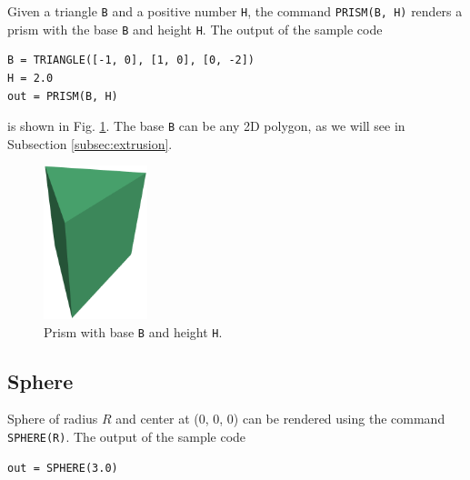 Given a triangle {\tt B} and a positive number {\tt H}, the command 
{\tt PRISM(B, H)} renders a prism with the base {\tt B} and height {\tt H}. 
The output of the sample code\\

\begin{bbox}
\begin{verbatim}
B = TRIANGLE([-1, 0], [1, 0], [0, -2])
H = 2.0
out = PRISM(B, H)
\end{verbatim}
\end{bbox}
\vspace{6mm}

\noindent
is shown in Fig. \ref{fig:prism}. The base {\tt B} can be any 2D polygon,
as we will see in Subsection \ref{subsec:extrusion}.\\

\begin{figure}[!ht]
\begin{center}
\includegraphics[width=0.27\textwidth]{img/prism-0.png}
\end{center}
\vspace{-4mm}
\caption{Prism with base {\tt B} and height {\tt H}.}
\label{fig:prism}
\vspace{-1cm}
\end{figure}


\subsection{Sphere}

Sphere of radius $R$ and center at (0, 0, 0) can be rendered using the command 
{\tt SPHERE(R)}. The output of the sample code\\

\begin{bbox}
\begin{verbatim}
out = SPHERE(3.0)
\end{verbatim}
\end{bbox}
\vspace{6mm}

